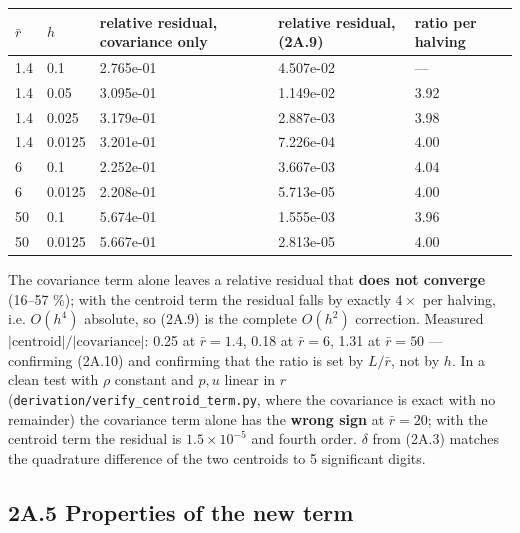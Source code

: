 \documentclass[11pt,a4paper]{article}
\begin{document}
\begin{longtable}{lllll}
\toprule
$\bar r$ & $h$ & relative residual, covariance only & relative residual, (2A.9) & ratio per halving \\
\midrule
1.4 & 0.1 & 2.765e-01 & 4.507e-02 & — \\
1.4 & 0.05 & 3.095e-01 & 1.149e-02 & 3.92 \\
1.4 & 0.025 & 3.179e-01 & 2.887e-03 & 3.98 \\
1.4 & 0.0125 & 3.201e-01 & 7.226e-04 & 4.00 \\
6 & 0.1 & 2.252e-01 & 3.667e-03 & 4.04 \\
6 & 0.0125 & 2.208e-01 & 5.713e-05 & 4.00 \\
50 & 0.1 & 5.674e-01 & 1.555e-03 & 3.96 \\
50 & 0.0125 & 5.667e-01 & 2.813e-05 & 4.00 \\
\bottomrule
\end{longtable}

The covariance term alone leaves a relative residual that \textbf{does not converge}
(16–57 \%); with the centroid term the residual falls by exactly $4\times$ per
halving, i.e. $O(h^4)$ absolute, so (2A.9) is the complete $O(h^2)$ correction.
Measured $|\text{centroid}|/|\text{covariance}|$: 0.25 at $\bar r=1.4$, 0.18 at
$\bar r=6$, 1.31 at $\bar r=50$ — confirming (2A.10) and confirming that the
ratio is set by $L/\bar r$, not by $h$. In a clean test with $\rho$ constant and
$p,u$ linear in $r$ (\texttt{derivation/verify\_centroid\_term.py}, where the covariance
is exact with no remainder) the covariance term alone has the \textbf{wrong sign} at
$\bar r=20$; with the centroid term the residual is $1.5\times10^{-5}$ and
fourth order. $\delta$ from (2A.3) matches the quadrature difference of the two
centroids to 5 significant digits.

\subsection*{2A.5 Properties of the new term}
\end{document}
